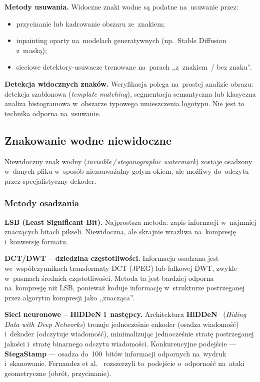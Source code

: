 \textbf{Metody usuwania.}
Widoczne znaki wodne s\k{a} podatne na~usuwanie przez:
\begin{itemize}
  \item przycinanie lub kadrowanie obszaru ze~znakiem;
  \item inpainting oparty na~modelach generatywnych
        (np.\ Stable Diffusion z~mask\k{a});
  \item sieciowe detektory-usuwacze trenowane na~parach
        ,,z~znakiem~/ bez znaku''.
\end{itemize}

\textbf{Detekcja widocznych znak\'{o}w.}
Weryfikacja polega na~prostej analizie obrazu:
detekcja szablonowa (\textit{template matching}),
segmentacja semantyczna lub klasyczna analiza histogramowa
w~obszarze typowego umieszczenia logotypu.
Nie jest to technika odporna na~usuwanie.

\subsection{Znakowanie wodne niewidoczne}
\label{sec:watermark_invisible}

Niewidoczny znak wodny (\textit{invisible\,/\,steganographic watermark})
zostaje osadzony w~danych pliku w~spos\'{o}b niezauwa\.{z}alny
go\l{}ym okiem, ale mo\.{z}liwy do~odczytu przez specjalistyczny
dekoder.

\subsubsection{Metody osadzania}
\label{sec:watermark_embed}

\textbf{LSB (Least Significant Bit).}
Najprostsza metoda: zapis informacji w~najmniej znacz\k{a}cych
bitach pikseli. Niewidoczna, ale skrajnie wra\.{z}liwa
na~kompresj\k{e} i~konwersj\k{e} formatu.

\textbf{DCT/DWT -- dziedzina cz\k{e}stotliwo\'{s}ci.}
Informacja osadzana jest we~wsp\'{o}\l{}czynnikach transformaty DCT (JPEG)
lub falkowej DWT, zwykle w~pasmach \'{s}rednich cz\k{e}stotliwo\'{s}ci.
Metoda ta jest bardziej odporna na~kompresj\k{e} ni\.{z} LSB,
poniewa\.{z} koduje informacj\k{e} w~strukturze postrzeganej
przez algorytm kompresji jako ,,znacz\k{a}ca''.

\textbf{Sieci neuronowe -- HiDDeN i~nast\k{e}pcy.}
Architektura \textbf{HiDDeN}~\cite{Zhu2018HiDDeN}
(\textit{Hiding Data with Deep Networks}) trenuje jednocze\'{s}nie
enkoder (osadza wiadomo\'{s}\'{c}) i~dekoder (odczytuje wiadomo\'{s}\'{c}),
minimalizuj\k{a}c jednocze\'{s}nie strat\k{e} postrzeganej jako\'{s}ci
i~strat\k{e} binarnego odczytu wiadomo\'{s}ci.
Konkurencyjne podej\'{s}cie --- \textbf{StegaStamp} --- osadza
do~100~bit\'{o}w informacji odpornych na~wydruk i~skanowanie.
Fernandez et al.\ \cite{Fernandez2024BlindWatermark}
rozszerzyli to~podej\'{s}cie o~odporno\'{s}\'{c} na~ataki
geometryczne (obr\'{o}t, przycinanie).


